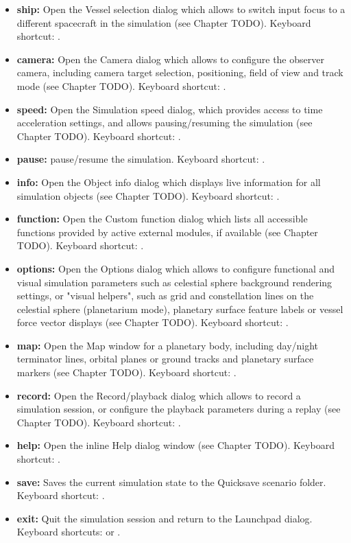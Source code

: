 \documentclass[Orbiter User Manual.tex]{subfiles}
\begin{document}
\begin{itemize}
\item \textbf{ship:} Open the Vessel selection dialog which allows to switch input focus to a different spacecraft in the simulation (see Chapter TODO). Keyboard shortcut: .
\item \textbf{camera:} Open the Camera dialog which allows to configure the observer camera, including camera target selection, positioning, field of view and track mode (see Chapter TODO). Keyboard shortcut: \Ctrl{}.
\item \textbf{speed:} Open the Simulation speed dialog, which provides access to time acceleration settings, and allows pausing/resuming the simulation (see Chapter TODO). Keyboard shortcut: \Ctrl{}.
\item \textbf{pause:} pause/resume the simulation. Keyboard shortcut: \Ctrl{}.
\item \textbf{info:} Open the Object info dialog which displays live information for all simulation objects (see Chapter TODO). Keyboard shortcut: \Ctrl{}.
\item \textbf{function:} Open the Custom function dialog which lists all accessible functions provided by active external modules, if available (see Chapter TODO). Keyboard shortcut: \Ctrl{}.
\item \textbf{options:} Open the Options dialog which allows to configure functional and visual simulation parameters such as celestial sphere background rendering settings, or "visual helpers", such as grid and constellation lines on the celestial sphere (planetarium mode), planetary surface feature labels or vessel force vector displays (see Chapter TODO). Keyboard shortcut: \Ctrl{}.
\item \textbf{map:} Open the Map window for a planetary body, including day/night terminator lines, orbital planes or ground tracks and planetary surface markers (see Chapter TODO). Keyboard shortcut: \Ctrl{}.
\item \textbf{record:} Open the Record/playback dialog which allows to record a simulation session, or configure the playback parameters during a replay (see Chapter TODO). Keyboard shortcut: \Ctrl{}.
\item \textbf{help:} Open the inline Help dialog window (see Chapter TODO). Keyboard shortcut: \Alt{}.
\item \textbf{save:} Saves the current simulation state to the Quicksave scenario folder. Keyboard shortcut: \Ctrl{}.
\item \textbf{exit:} Quit the simulation session and return to the Launchpad dialog. Keyboard shortcuts: \Ctrl{} or \Alt{}.
\end{itemize}
\end{document}
